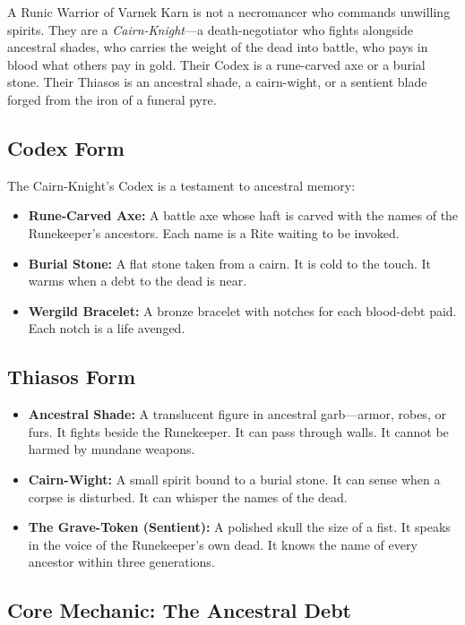 A Runic Warrior of Varnek Karn is not a necromancer who commands unwilling spirits. They are a \textit{Cairn-Knight}—a death-negotiator who fights alongside ancestral shades, who carries the weight of the dead into battle, who pays in blood what others pay in gold. Their Codex is a rune-carved axe or a burial stone. Their Thiasos is an ancestral shade, a cairn-wight, or a sentient blade forged from the iron of a funeral pyre.

\subsection{Codex Form}

The Cairn-Knight's Codex is a testament to ancestral memory:

\begin{itemize}
\item \textbf{Rune-Carved Axe:} A battle axe whose haft is carved with the names of the Runekeeper's ancestors. Each name is a Rite waiting to be invoked.
\item \textbf{Burial Stone:} A flat stone taken from a cairn. It is cold to the touch. It warms when a debt to the dead is near.
\item \textbf{Wergild Bracelet:} A bronze bracelet with notches for each blood-debt paid. Each notch is a life avenged.
\end{itemize}

\subsection{Thiasos Form}

\begin{itemize}
\item \textbf{Ancestral Shade:} A translucent figure in ancestral garb—armor, robes, or furs. It fights beside the Runekeeper. It can pass through walls. It cannot be harmed by mundane weapons.
\item \textbf{Cairn-Wight:} A small spirit bound to a burial stone. It can sense when a corpse is disturbed. It can whisper the names of the dead.
\item \textbf{The Grave-Token (Sentient):} A polished skull the size of a fist. It speaks in the voice of the Runekeeper's own dead. It knows the name of every ancestor within three generations.
\end{itemize}

\subsection{Core Mechanic: The Ancestral Debt}

